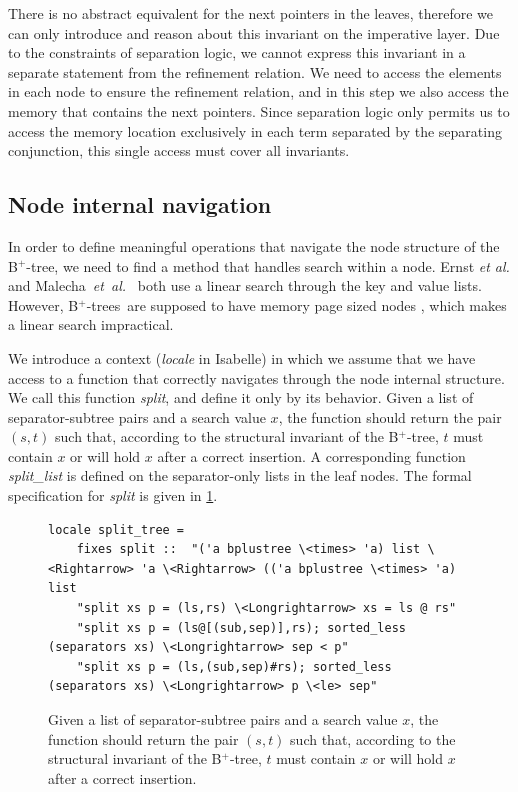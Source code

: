 \documentclass[a4paper,UKenglish,cleveref, cref, thm-restate]{lipics-v2021}
\newcommand{\btree}{B$^+$-tree}
\newcommand{\btrees}{B$^+$-trees}
\begin{document}
There is no abstract equivalent for the next pointers in the leaves,
therefore we can only introduce and reason about this invariant on the imperative layer.
Due to the constraints of separation logic, we cannot express this invariant
in a separate statement from the refinement relation.
We need to access the elements in each node to ensure the refinement relation,
and in this step we also access the memory that contains the next pointers.
Since separation logic only permits us to access the memory location
exclusively in each term separated by the separating conjunction, this single access 
must cover all invariants.


\subsection{Node internal navigation}
\label{sec:split}

In order to define meaningful operations that navigate
the node structure of the \btree,
we need to find a method that handles search within a node.
Ernst \emph{et al.} \cite{DBLP:journals/sosym/ErnstSR15} and Malecha~\emph{et~al.}~\cite{DBLP:conf/popl/MalechaMSW10}
both use a linear search through the key and value lists.
However, \btrees\ are supposed to have memory page sized nodes \cite{DBLP:journals/csur/Comer79}, 
which makes a linear search impractical.

We introduce a context (\emph{locale} in Isabelle) in which we assume that we
have access to a function that correctly navigates through the node internal structure.
We call this function \emph{split}, and define it only by its behavior.
Given a list of separator-subtree pairs and a search value $x$, the function should return the pair $(s,t)$ such that,
according to the structural invariant of the \btree, $t$ must contain $x$ or will hold $x$ after a correct insertion.
A corresponding function \emph{split\_list} is defined on the separator-only lists in the leaf nodes.
The formal specification for \emph{split} is given in \cref{fig:split-def}.

\begin{figure}
   \centering 
\begin{lstlisting}[mathescape=true, language=Isabelle,label=lst:split-def]
locale split_tree =
    fixes split ::  "('a bplustree \<times> 'a) list \<Rightarrow> 'a \<Rightarrow> (('a bplustree \<times> 'a) list 
    "split xs p = (ls,rs) \<Longrightarrow> xs = ls @ rs" 
    "split xs p = (ls@[(sub,sep)],rs); sorted_less (separators xs) \<Longrightarrow> sep < p" 
    "split xs p = (ls,(sub,sep)#rs); sorted_less (separators xs) \<Longrightarrow> p \<le> sep" 

\end{lstlisting}
    \caption[Definition of \emph{split}]{
        Given a list of separator-subtree pairs and a search value $x$, the function should return the pair $(s,t)$ such that,
        according to the structural invariant of the \btree, $t$ must contain $x$ or will hold $x$ after a correct insertion.
    }
    \label{fig:split-def}
\end{figure}
\end{document}
